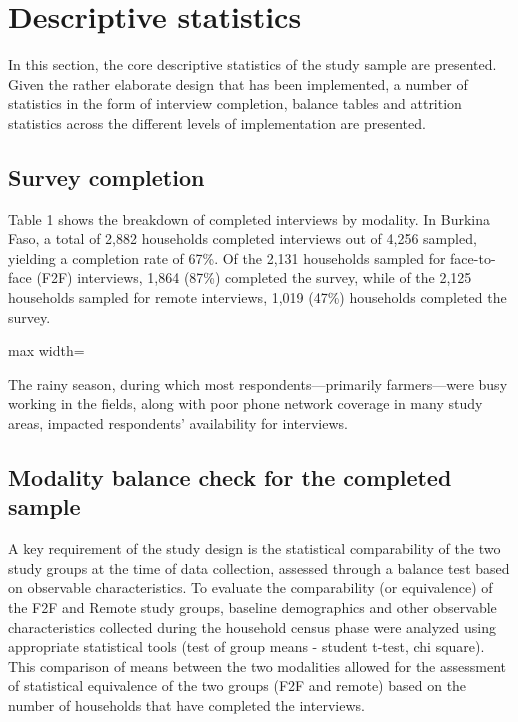 \documentclass[11pt,harvard]{article}
\begin{document}
	
	\section{Descriptive statistics}
	
	In this section, the core descriptive statistics of the study sample are presented. Given the rather elaborate design that has been implemented, a number of statistics in the form of interview completion, balance tables and attrition statistics across the different levels of implementation are presented.
	
	\subsection{Survey completion}
	
	Table 1 shows the breakdown of completed interviews by modality. In Burkina Faso, a total of 2,882 households completed interviews out of 4,256 sampled, yielding a completion rate of 67\%. Of the 2,131 households sampled for face-to-face (F2F) interviews, 1,864 (87\%) completed the survey, while of the 2,125 households sampled for remote interviews, 1,019 (47\%) households completed the survey.
	 
	\begin{table}[htbp]
		\centering
		\begin{adjustbox}{max width=\textwidth}
			\begin{threeparttable}
				\caption{Sample Completion: Face-to-Face vs. Remote}
				\scriptsize
				 
				\label{tab:BF_rCARI_Completion}
			\end{threeparttable}
		\end{adjustbox}
	\end{table}
	
	The rainy season, during which most respondents—primarily farmers—were busy working in the fields, along with poor phone network coverage in many study areas, impacted respondents’ availability for interviews.
	
	
	\subsection{Modality balance check for the completed sample}

	A key requirement of the study design is the statistical comparability of the two study groups at the time of data collection, assessed through a balance test based on observable characteristics. To evaluate the comparability (or equivalence) of the F2F and Remote study groups, baseline demographics and other observable characteristics collected during the household census phase were analyzed using appropriate statistical tools (test of group means - student t-test, chi square). This comparison of means between the two modalities allowed for the assessment of statistical equivalence of the two groups (F2F and remote) based on the number of households that have completed the interviews. 
	
\end{document}
